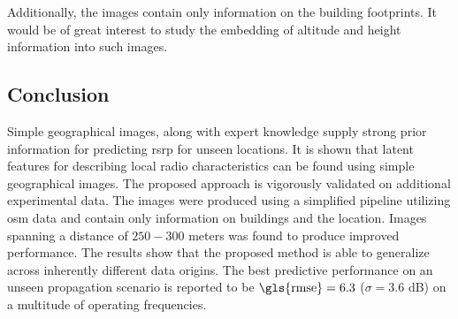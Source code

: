 Additionally, the images contain only information on the building footprints. It would be of great interest to study the embedding of altitude and height information into such images. 


\subsection{Conclusion}\label{subsec:conclusion_v3}
Simple geographical images, along with expert knowledge supply strong prior information for predicting \gls{rsrp} for unseen locations. It is shown that latent features for describing local radio characteristics can be found using simple geographical images. The proposed approach is vigorously validated on additional experimental data. The images were produced using a simplified pipeline utilizing \gls{osm} data and contain only information on buildings and the location. Images spanning a distance of $250-300$ meters was found to produce improved performance. The results show that the proposed method is able to generalize across inherently different data origins. The best predictive performance on an unseen propagation scenario is reported to be $\text{\gls{rmse}} = 6.3$ ($\sigma = 3.6$ dB) on a multitude of operating frequencies.

